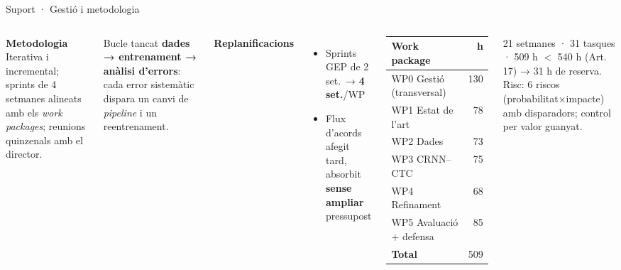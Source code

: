 \documentclass[aspectratio=169,10pt]{beamer}
\newcommand{\stat}[1]{{\AdwaitaHeavy\color{ink}#1}}
\begin{document}
\begin{frame}{Suport · Gestió i metodologia}
  \begin{columns}[T]
    \textbf{\color{accent}Metodologia}\\[0.2em]
    {\small Iterativa i incremental; sprints de 4 setmanes alineats amb els \textit{work packages}; reunions quinzenals amb el director.}
    \vspace{0.5em}

    {\small Bucle tancat \textbf{dades → entrenament → anàlisi d'errors}: cada error sistemàtic dispara un canvi de \textit{pipeline} i un reentrenament.}
    \vspace{0.5em}

    \textbf{\color{accent}Replanificacions}
    {\small
    \begin{itemize}\setlength\itemsep{0.2em}
      \item Sprints GEP de 2 set.\ → \textbf{4 set.}/WP
      \item Flux d'acords afegit tard, absorbit \textbf{sense ampliar} pressupost
    \end{itemize}}

    \centering
    {\renewcommand{\arraystretch}{1.15}\small
    \begin{tabular}{@{}l r@{}}
      \toprule
      \textbf{Work package} & \textbf{h} \\
      \midrule
      WP0 Gestió (transversal) & 130 \\
      WP1 Estat de l'art        & 78 \\
      WP2 Dades                 & 73 \\
      WP3 CRNN--CTC             & 75 \\
      WP4 Refinament            & 68 \\
      WP5 Avaluació + defensa   & 85 \\
      \midrule
      \textbf{Total}            & \stat{509} \\
      \bottomrule
    \end{tabular}}

    \vspace{0.5em}
    {\footnotesize\color{muted} 21 setmanes · 31 tasques · 509 h $<$ 540 h (Art.\,17) → 31 h de reserva. Risc: 6 riscos (probabilitat×impacte) amb disparadors; control per valor guanyat.}
  \end{columns}
\end{frame}
\end{document}
